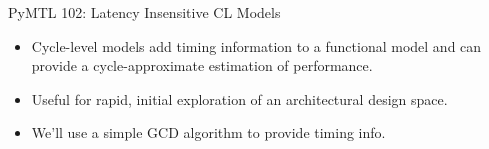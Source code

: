 \begin{frame}{PyMTL 102: Latency Insensitive CL Models}

\begin{itemize}
  \item Cycle-level models add timing information to a functional model
        and can provide a cycle-approximate estimation of performance.
  \smallskip
  \item Useful for rapid, initial exploration of an
        architectural design space.
  \smallskip
  \item We'll use a simple GCD algorithm to provide timing info.
\end{itemize}

\end{frame}
